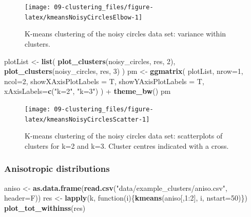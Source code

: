 \documentclass[]{book}
\newenvironment{Shaded}{\begin{snugshade}}{\end{snugshade}}
\newcommand{\KeywordTok}[1]{\textcolor[rgb]{0.13,0.29,0.53}{\textbf{{#1}}}}
\newcommand{\DataTypeTok}[1]{\textcolor[rgb]{0.13,0.29,0.53}{{#1}}}
\newcommand{\DecValTok}[1]{\textcolor[rgb]{0.00,0.00,0.81}{{#1}}}
\newcommand{\StringTok}[1]{\textcolor[rgb]{0.31,0.60,0.02}{{#1}}}
\newcommand{\NormalTok}[1]{{#1}}
\theoremstyle{definition}
\theoremstyle{definition}
\theoremstyle{definition}
\theoremstyle{remark}
\begin{document}
\begin{figure}

{\centering \texttt{[image: 09-clustering\_files/figure-latex/kmeansNoisyCirclesElbow-1]} 

}

\caption{K-means clustering of the noisy circles data set: variance within clusters.}\label{fig:kmeansNoisyCirclesElbow}
\end{figure}

\begin{Shaded}
\begin{Highlighting}[]
\NormalTok{plotList <-}\StringTok{ }\KeywordTok{list}\NormalTok{(}
  \KeywordTok{plot_clusters}\NormalTok{(noisy_circles, res, }\DecValTok{2}\NormalTok{),}
  \KeywordTok{plot_clusters}\NormalTok{(noisy_circles, res, }\DecValTok{3}\NormalTok{)}
\NormalTok{)}
\NormalTok{pm <-}\StringTok{ }\KeywordTok{ggmatrix}\NormalTok{(}
  \NormalTok{plotList, }\DataTypeTok{nrow=}\DecValTok{1}\NormalTok{, }\DataTypeTok{ncol=}\DecValTok{2}\NormalTok{, }\DataTypeTok{showXAxisPlotLabels =} \NormalTok{T, }
  \DataTypeTok{showYAxisPlotLabels =} \NormalTok{T, }\DataTypeTok{xAxisLabels=}\KeywordTok{c}\NormalTok{(}\StringTok{"k=2"}\NormalTok{, }\StringTok{"k=3"}\NormalTok{)}
\NormalTok{) +}\StringTok{ }\KeywordTok{theme_bw}\NormalTok{()}
\NormalTok{pm}
\end{Highlighting}
\end{Shaded}

\begin{figure}

{\centering \texttt{[image: 09-clustering\_files/figure-latex/kmeansNoisyCirclesScatter-1]} 

}

\caption{K-means clustering of the noisy circles data set: scatterplots of clusters for k=2 and k=3. Cluster centres indicated with a cross.}\label{fig:kmeansNoisyCirclesScatter}
\end{figure}

\subsubsection{Anisotropic
distributions}\label{anisotropic-distributions}

\begin{Shaded}
\begin{Highlighting}[]
\NormalTok{aniso <-}\StringTok{ }\KeywordTok{as.data.frame}\NormalTok{(}\KeywordTok{read.csv}\NormalTok{(}\StringTok{"data/example_clusters/aniso.csv"}\NormalTok{, }\DataTypeTok{header=}\NormalTok{F))}
\NormalTok{res <-}\StringTok{ }\KeywordTok{lapply}\NormalTok{(k, function(i)\{}\KeywordTok{kmeans}\NormalTok{(aniso[,}\DecValTok{1}\NormalTok{:}\DecValTok{2}\NormalTok{], i, }\DataTypeTok{nstart=}\DecValTok{50}\NormalTok{)\})}
\KeywordTok{plot_tot_withinss}\NormalTok{(res)}
\end{Highlighting}
\end{Shaded}
\end{document}
